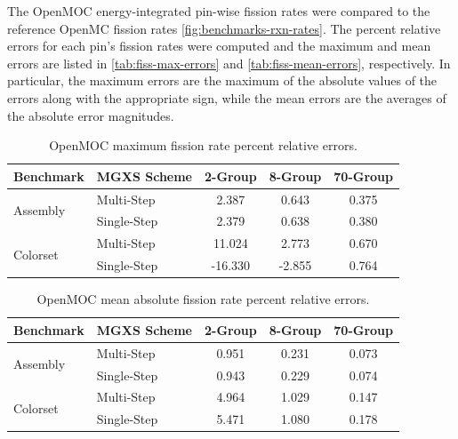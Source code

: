 The OpenMOC energy-integrated pin-wise fission rates were compared to the reference OpenMC fission rates \autoref{fig:benchmarks-rxn-rates}. The percent relative errors for each pin's fission rates were computed and the maximum and mean errors are listed in \autoref{tab:fiss-max-errors} and \autoref{tab:fiss-mean-errors}, respectively. In particular, the maximum errors are the maximum of the absolute values of the errors along with the appropriate sign, while the mean errors are the averages of the absolute error magnitudes.

\begin{table}[h!]
  \centering
  \caption{OpenMOC maximum fission rate percent relative errors.}
  \label{tab:fiss-max-errors}
  \begin{tabular}{l l c c c}
  \toprule
  \textbf{Benchmark} & \textbf{MGXS Scheme} & \textbf{2-Group} & \textbf{8-Group} & \textbf{70-Group} \\
  \midrule
  \multirow{2}{*}{Assembly} & Multi-Step    & 2.387 & 0.643 & 0.375 \\
                            & Single-Step & 2.379 & 0.638 & 0.380 \\
  \midrule
  \multirow{2}{*}{Colorset} & Multi-Step    &  11.024 &  2.773 & 0.670 \\
                            & Single-Step & -16.330 & -2.855 & 0.764 \\
  \bottomrule
\end{tabular}
\end{table}

\begin{table}[h!]
  \centering
  \caption{OpenMOC mean absolute fission rate percent relative errors.}
  \label{tab:fiss-mean-errors}
  \begin{tabular}{l l c c c}
  \toprule
  \textbf{Benchmark} & \textbf{MGXS Scheme} & \textbf{2-Group} & \textbf{8-Group} & \textbf{70-Group} \\
  \midrule
  \multirow{2}{*}{Assembly} & Multi-Step    & 0.951 & 0.231 & 0.073 \\
                            & Single-Step & 0.943 & 0.229 & 0.074 \\
  \midrule
  \multirow{2}{*}{Colorset} & Multi-Step    & 4.964 & 1.029 & 0.147 \\
                            & Single-Step & 5.471 & 1.080 & 0.178 \\
  \bottomrule
\end{tabular}
\end{table}

